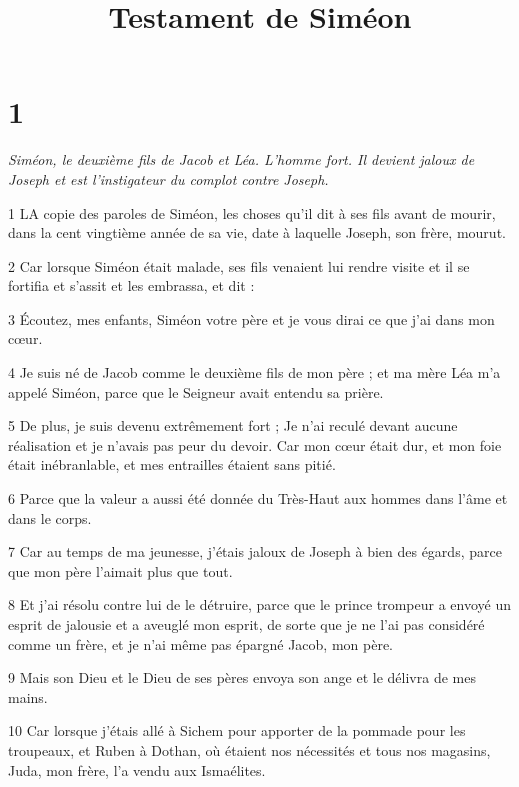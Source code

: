 

\title{Testament de Siméon}

\chapter{1}

\par \textit{Siméon, le deuxième fils de Jacob et Léa. L'homme fort. Il devient jaloux de Joseph et est l'instigateur du complot contre Joseph.}

\par 1 LA copie des paroles de Siméon, les choses qu'il dit à ses fils avant de mourir, dans la cent vingtième année de sa vie, date à laquelle Joseph, son frère, mourut.

\par 2 Car lorsque Siméon était malade, ses fils venaient lui rendre visite et il se fortifia et s'assit et les embrassa, et dit :

\par 3 Écoutez, mes enfants, Siméon votre père et je vous dirai ce que j'ai dans mon cœur.

\par 4 Je suis né de Jacob comme le deuxième fils de mon père ; et ma mère Léa m'a appelé Siméon, parce que le Seigneur avait entendu sa prière.

\par 5 De plus, je suis devenu extrêmement fort ; Je n’ai reculé devant aucune réalisation et je n’avais pas peur du devoir. Car mon cœur était dur, et mon foie était inébranlable, et mes entrailles étaient sans pitié.

\par 6 Parce que la valeur a aussi été donnée du Très-Haut aux hommes dans l'âme et dans le corps.

\par 7 Car au temps de ma jeunesse, j'étais jaloux de Joseph à bien des égards, parce que mon père l'aimait plus que tout.

\par 8 Et j'ai résolu contre lui de le détruire, parce que le prince trompeur a envoyé un esprit de jalousie et a aveuglé mon esprit, de sorte que je ne l'ai pas considéré comme un frère, et je n'ai même pas épargné Jacob, mon père.

\par 9 Mais son Dieu et le Dieu de ses pères envoya son ange et le délivra de mes mains.

\par 10 Car lorsque j'étais allé à Sichem pour apporter de la pommade pour les troupeaux, et Ruben à Dothan, où étaient nos nécessités et tous nos magasins, Juda, mon frère, l'a vendu aux Ismaélites.

